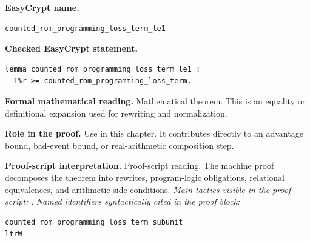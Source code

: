 \begin{formaltheorem}
\noindent\textbf{EasyCrypt name.}
\begin{lstlisting}[language=EasyCrypt,basicstyle=\ttfamily\scriptsize]
counted_rom_programming_loss_term_le1
\end{lstlisting}
\noindent\textbf{Checked EasyCrypt statement.}
\begin{lstlisting}[language=EasyCrypt,basicstyle=\ttfamily\scriptsize]
lemma counted_rom_programming_loss_term_le1 :
  1%r >= counted_rom_programming_loss_term.
\end{lstlisting}
\noindent\textbf{Formal mathematical reading.}
Mathematical theorem. This is an equality or definitional expansion used for rewriting and normalization.

\noindent\textbf{Role in the proof.}
Use in this chapter. It contributes directly to an advantage bound, bad-event bound, or real-arithmetic composition step.

\noindent\textbf{Proof-script interpretation.}
Proof-script reading. The machine proof decomposes the theorem into rewrites, program-logic obligations, relational equivalences, and arithmetic side conditions.
\emph{Main tactics visible in the proof script:} .
\emph{Named identifiers syntactically cited in the proof block:}
\begin{lstlisting}[language=EasyCrypt,basicstyle=\ttfamily\scriptsize]
counted_rom_programming_loss_term_subunit
ltrW
\end{lstlisting}

\end{formaltheorem}

